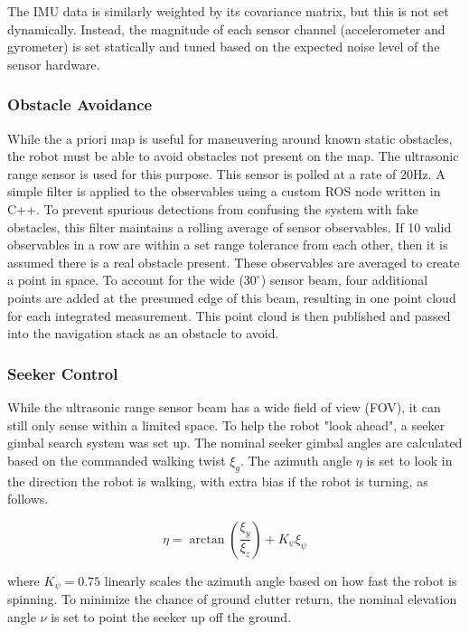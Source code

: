 The IMU data is similarly weighted by its covariance matrix, but this is not set dynamically. Instead, the magnitude of each sensor channel (accelerometer and gyrometer) is set statically and tuned based on the expected noise level of the sensor hardware.

\subsubsection{ Obstacle Avoidance }

While the a priori map is useful for maneuvering around known static obstacles, the robot must be able to avoid obstacles not present on the map. The ultrasonic range sensor is used for this purpose. This sensor is polled at a rate of 20Hz. A simple filter is applied to the observables using a custom ROS node written in C++. To prevent spurious detections from confusing the system with fake obstacles, this filter maintains a rolling average of sensor observables. If 10 valid observables in a row are within a set range tolerance from each other, then it is assumed there is a real obstacle present. These observables are averaged to create a point in space. To account for the wide ($30^{\circ}$) sensor beam, four additional points are added at the presumed edge of this beam, resulting in one point cloud for each integrated measurement. This point cloud is then published and passed into the navigation stack as an obstacle to avoid.

\subsubsection{ Seeker Control }

While the ultrasonic range sensor beam has a wide field of view (FOV), it can still only sense within a limited space. To help the robot "look ahead", a seeker gimbal search system was set up. The nominal seeker gimbal angles are calculated based on the commanded walking twist $\xi_g$. The azimuth angle $\eta$ is set to look in the direction the robot is walking, with extra bias if the robot is turning, as follows.

\begin{equation}
    \eta = \arctan( \frac{ \xi_y }{\xi_z} ) + K_{\psi} \xi_{\psi}
\end{equation}

where $K_{\psi}=0.75$ linearly scales the azimuth angle based on how fast the robot is spinning. To minimize the chance of ground clutter return, the nominal elevation angle $\nu$ is set to point the seeker up off the ground. 

